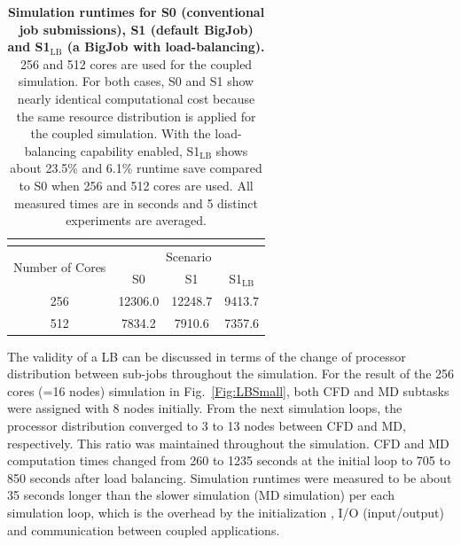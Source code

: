 \documentclass[preprint,12pt]{elsarticle}
\newcommand{\subscript}[1]{\ensuremath{_{\textrm{#1}}}}
\newcommand{\lb}[0]{\subscript{LB} }
\begin{document}
\begin{table}
  \caption{\small {\bf Simulation runtimes for S0 (conventional job submissions), S1 (default BigJob) and S1\lb (a BigJob with load-balancing).} 256 and 512 cores are used for the coupled simulation. For both cases, S0 and S1 show nearly identical computational cost because the same resource distribution is applied for the coupled simulation. With the load-balancing capability enabled, S1\lb shows about 23.5\% and 6.1\% runtime save compared to S0 when 256 and 512 cores are used. All measured times are in seconds and 5 distinct experiments are averaged.}
\label{table:oneBJ_Test}
\centering\footnotesize
 \begin{tabular}{c | c | c | c }
 \multicolumn{4}{c}{\phantom{\tiny 100}}\\
\hline
\multirow{2}{0.15\textwidth}{Number of Cores} & \multicolumn{3}{c}{Scenario} \\
\cline{2-4} 
& \multirow{1}{0.15\textwidth}{S0} & 
\multirow{1}{0.15\textwidth}{S1} & \multirow{1}{0.15\textwidth}{S1\lb} \\
\hline
\hline
256 & 12306.0 & 12248.7 & 9413.7 \\
512 & 7834.2 & 7910.6 & 7357.6 \\ 
\hline
\end{tabular}
\vspace{-1em}
\end{table}


The validity of a LB can be discussed in terms of the change of processor distribution between sub-jobs throughout the simulation. For the result of the 256 cores (=16 nodes) simulation in Fig.~\ref{Fig:LBSmall}, both CFD and MD subtasks were assigned with 8 nodes initially. From the next simulation loops, the processor distribution converged to 3 to 13 nodes between CFD and MD, respectively. This ratio was maintained throughout the simulation. CFD and MD computation times changed from 260 to 1235 seconds at the initial loop to 705 to 850 seconds after load balancing. Simulation runtimes were measured to be about 35 seconds longer than the slower simulation (MD simulation) per each simulation loop, which is the overhead by the initialization , I/O (input/output) and communication between coupled applications.
\end{document}
